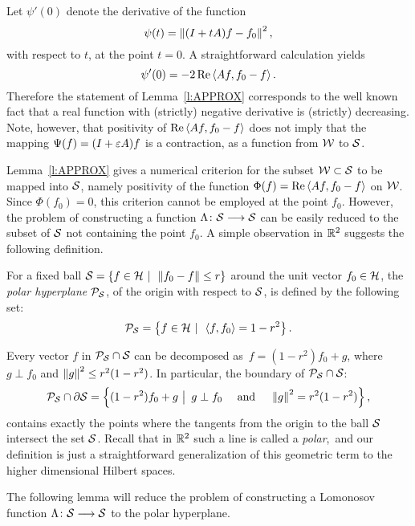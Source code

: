 \newpage

\begin{rem}
Let $\psi'(0)$ denote the derivative of the function
\[ \psi(t)=\left\Vert(I+t{A})f-f_0\right\Vert^2, \]
with respect to $t$, at the point $t=0$. A straightforward calculation yields
\[ \psi'(0)=-2\operatorname{Re}\left<A{f},f_0-f\right>. \]
Therefore the statement of Lemma~\ref{l:APPROX} corresponds to the well known
fact that a real function with (strictly) negative derivative is (strictly)
decreasing. Note, however, that positivity of $\operatorname{Re}\left<A{f},f_0-f\right>$ does not
imply that the mapping $\Psi(f)=(I+\varepsilon A)f$ is a contraction, as a function
from ${\cal W}$ to ${\cal S}$.
\end{rem}

\medskip

Lemma~\ref{l:APPROX} gives a numerical criterion for the subset ${\cal W}\subset{\cal S}$
to be mapped into ${\cal S}$, namely positivity of the function
$\Phi(f)=\operatorname{Re}\left<A{}f,f_0-f\right>$ on ${\cal W}$. Since $\Phi(f_0)=0$, this criterion
cannot be employed at the point $f_0$. However, the problem of constructing a
function $\Lambda\colon{\cal S}\longrightarrow{\cal S}$ can be easily reduced to the subset of ${\cal S}$
not containing the point $f_0$. A simple observation in $\mathbb R^2$ suggests
the following definition.

\newcommand{\Polar}{{\cal P}_{\s}}
\begin{defn}
For a fixed ball ${\cal S}=\left\{f\in{\cal H}\,\,|\,\,\, \left\Vert f_0-f\right\Vert\leq r\right\}$ around the
unit vector $f_0\in{\cal H}$, the {\em polar hyperplane} $\Polar$, of the origin
with respect to ${\cal S}$, is defined by the following set:
\[ \Polar = \set{f\in\h\,\,|\,\,\, \seq{f,f_0}=1-r^2}. \]
\end{defn}

\begin{rem}
Every vector $f$ in $\Polar\cap\s$ can be decomposed as\, $ f = (1-r^2)f_0 +
g$, where $g\perp f_0$ and $\left\Vert g\right\Vert^2\leq r^2(1-r^2)$. In particular, the
boundary of $\Polar\cap\s$:
\[ \Polar \cap \partial \s = \set{(1-r^2)f_0 + g\,\,\big|\,\,\,
   g\perp f_0 \quad\text{ and }\quad \norm{g}^2=r^2(1-r^2)}, \]
contains exactly the points where the tangents from the origin to the ball
${\cal S}$ intersect the set ${\cal S}$. Recall that in $\mathbb R^2$ such a line is called a
{\em polar},\, and our definition is just a straightforward generalization of
this geometric term to the higher dimensional Hilbert spaces.
\end{rem}

\medskip

The following lemma will reduce the problem of constructing a Lomonosov
function $\Lambda\colon{\cal S}\longrightarrow{\cal S}$ to the polar hyperplane.

